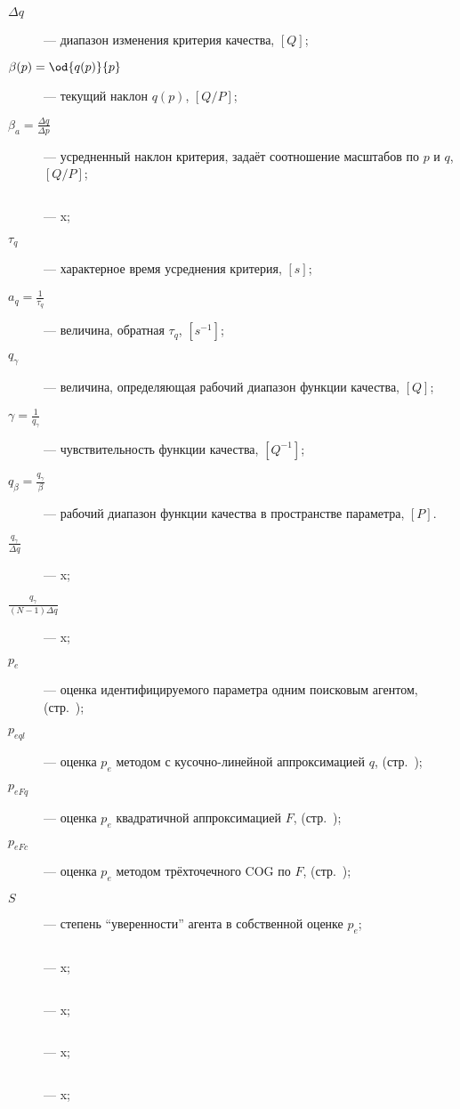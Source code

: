 \begin{description}
  \item[$\Delta q$]  --- диапазон изменения критерия качества, $[Q]$;

  \item[$\beta(p) = \od{q(p)}{p}$]  --- текущий наклон $q(p)$, $[Q/P]$;

  \item[$\beta_a = \frac{\Delta q}{\Delta p} $]  --- усредненный наклон критерия, задаёт соотношение масштабов по $p$ и $q$, $[Q/P]$;

  \item[$ $]  --- x;

  \item[$\tau_q$]  --- характерное время усреднения критерия, $[s]$;

  \item[$a_q = \frac{1}{\tau_q} $]  --- величина, обратная $\tau_q$, $[s^{-1}]$;

  \item[$q_\gamma $]  --- величина, определяющая рабочий диапазон функции качества, $[Q]$;

  \item[$\gamma = \frac{1}{q_\gamma} $]  --- чувствительность функции качества, $[Q^{-1}]$;

  \item[$q_\beta = \frac{q_\gamma}{\beta} $]  --- рабочий диапазон функции качества в пространстве параметра, $[P]$.

  \item[$\frac{q_\gamma}{\Delta q} $]  --- x;

  \item[$\frac{q_\gamma}{(N-1)\Delta q} $]  --- x;

  \item[$p_{e} $]  --- оценка идентифицируемого параметра одним поисковым агентом, (стр.~\pageref{atu:d:p_e});

  \item[$p_{eql} $]  --- оценка $p_e$ методом с кусочно-линейной аппроксимацией $q$, (стр.~\pageref{atu:d:p_eql});

  \item[$p_{eFq} $]  --- оценка $p_e$ квадратичной аппроксимацией $F$, (стр.~\pageref{atu:eq:p_eFq});

  \item[$p_{eFc} $]  --- оценка $p_e$ методом трёхточечного COG по $F$, (стр.~\pageref{atu:eq:p_eFc});

  \item[$S$]  --- степень ``уверенности'' агента в собственной оценке $p_e$;

  \item[$ $]  --- x;

  \item[$ $]  --- x;

  \item[$ $]  --- x;

  \item[$ $]  --- x;


\end{description}



